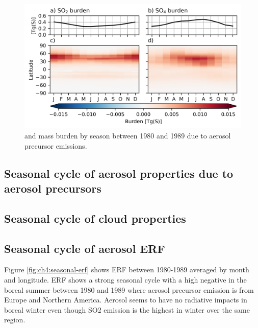 \begin{figure}
    \centering
    \includegraphics{Chapter4/Figs/seasonal_s_burden_1980.png}
    \caption[ and  mass burden by season between 1980 and 1989]{ and  mass burden by season between 1980 and 1989 due to aerosol precursor emissions.}
    \label{fig:ch4:seasonal-s-burden}
\end{figure}


\subsection{Seasonal cycle of aerosol properties due to aerosol precursors}


\subsection{Seasonal cycle of cloud properties}


\subsection{Seasonal cycle of aerosol ERF}
Figure \ref{fig:ch4:seasonal-erf} shows ERF between 1980-1989 averaged by month and longitude.  ERF shows a strong seasonal cycle with a high negative in the boreal summer between 1980 and 1989 where aerosol precursor emission is from Europe and Northern America. Aerosol seems to have no radiative impacts in boreal winter even though SO2 emission is the highest in winter over the same region.

